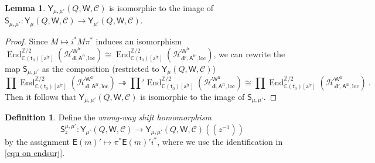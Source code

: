 \documentclass[10pt]{amsart}
\theoremstyle{definition}
\newtheorem{Lemma}[Theorem]{Lemma}
\newtheorem{Definition}[Theorem]{Definition}
\numberwithin{equation}{section}
\newcommand{\bC}{\mathbb{C}}
\newcommand{\bZ}{\mathbb{Z}}
\newcommand{\bd}{\mathbf{d}}
\newcommand{\cH}{\mathcal{H}}
\newcommand{\sS}{\mathsf{S}}
\newcommand{\sW}{\mathsf{W}}
\newcommand{\End}{\operatorname{End}}
\begin{document}
\begin{Lemma}
$\mathsf Y_{\mu,\mu'}(Q,\sW,\mathcal C)$ is isomorphic to the image of $\sS_{\mu,\mu'}\colon \mathsf Y_{\mu}(Q,\sW,\mathcal C)\to \mathsf Y_{\mu'}(Q,\sW,\mathcal C)$.
\end{Lemma}

\begin{proof}
Since $M\mapsto i^*M\pi^*$ induces an isomorphism $ \End^{\bZ/2}_{\bC(\mathsf t_0)[\mathsf a^{\mathrm{fr}}]}(\cH^{\sW^{\mathrm{fr}}}_{\underline{\bd},\mathsf A^{\mathrm{fr}},\mathrm{loc}})\cong \End^{\bZ/2}_{\bC(\mathsf t_0)[\mathsf a^{\mathrm{fr}}]}(\cH^{\sW^{\mathrm{fr}}}_{\underline{\bd}',\mathsf A^{\mathrm{fr}},\mathrm{loc}})$, we can rewrite the map $\sS_{\mu,\mu'}$ as the composition (restricted to $\mathsf Y_{\mu}(Q,\sW,\mathcal C)$) 
\begin{equation}\label{equ on endsurj}
    \prod\End^{\bZ/2}_{\bC(\mathsf t_0)[\mathsf a^{\mathrm{fr}}]}(\cH^{\sW^{\mathrm{fr}}}_{\underline{\bd},\mathsf A^{\mathrm{fr}},\mathrm{loc}})\twoheadrightarrow{\prod}'\End^{\bZ/2}_{\bC(\mathsf t_0)[\mathsf a^{\mathrm{fr}}]}(\cH^{\sW^{\mathrm{fr}}}_{\underline{\bd},\mathsf A^{\mathrm{fr}},\mathrm{loc}})\cong \prod \End^{\bZ/2}_{\bC(\mathsf t_0)[\mathsf a^{\mathrm{fr}}]}(\cH^{\sW^{\mathrm{fr}}}_{\underline{\bd}',\mathsf A^{\mathrm{fr}},\mathrm{loc}})\:.
\end{equation}
Then it follows that $\mathsf Y_{\mu,\mu'}(Q,\sW,\mathcal C)$ is isomorphic to the image of $\sS_{\mu,\mu'}$.
\end{proof}

\begin{Definition}\label{def of wrong-way shift}
Define the \textit{wrong-way shift homomorphism }
$$\sS^{\mu,\mu'}_z\colon \mathsf Y_{\mu'}(Q,\sW,\mathcal C)\to \mathsf Y_{\mu,\mu'}(Q,\sW,\mathcal C)(\!(z^{-1})\!)$$ 
by the assignment $\mathsf E(m)'\mapsto \pi^*\mathsf E(m)'i^*$, where we use the identification in \eqref{equ on endsurj}.
\end{Definition}
\end{document}

